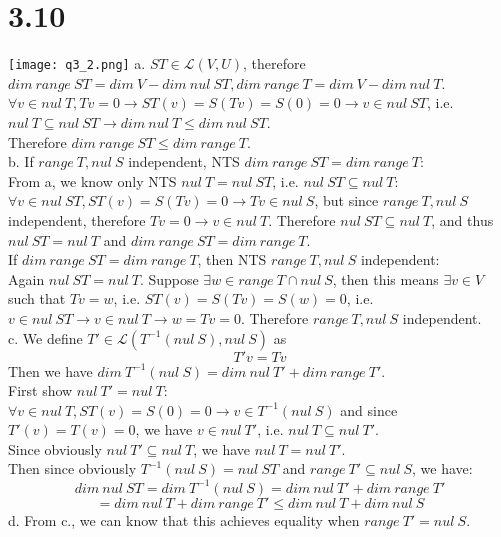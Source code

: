 \documentclass{article}
\begin{document}
\section{3.10}
\texttt{[image: q3\_2.png]}
a. $ST \in \mathcal{L}(V, U)$, therefore $dim\ range\ ST = dim\ V - dim\ nul\ ST, dim\ range\ T = dim\ V - dim\ nul\ T$.\\
$\forall v \in nul\ T, Tv = 0 \rightarrow ST(v) = S(Tv) = S(0) = 0 \rightarrow v \in nul\ ST$, i.e. $nul\ T \subseteq nul\ ST \rightarrow dim\ nul\ T \leq dim\ nul\ ST$.\\
Therefore $dim\ range\ ST \leq dim\ range\ T$.\\
b. If $range\ T, nul\ S$ independent, NTS $dim\ range\ ST = dim\ range\ T$:\\
From a, we know only NTS $nul\ T = nul\ ST$, i.e. $nul\ ST \subseteq nul\ T$:\\
$\forall v \in nul\ ST, ST(v) = S(Tv) = 0 \rightarrow Tv \in nul\ S$, but since $range\ T, nul\ S$ independent, therefore $Tv = 0 \rightarrow v \in nul\ T$. Therefore $nul\ ST \subseteq nul\ T$, and thus $nul\ ST = nul\ T$ and $dim\ range\ ST = dim\ range\ T$.\\
If $dim\ range\ ST = dim\ range\ T$, then NTS $range\ T, nul\ S$ independent:\\
Again $nul\ ST = nul\ T$. Suppose $\exists w \in range\ T \cap nul\ S$, then this means $\exists v \in V$ such that $Tv = w$, i.e. $ST(v) = S(Tv) = S(w) = 0$, i.e. $v \in nul\ ST \rightarrow v \in nul\ T \rightarrow w = Tv = 0$. Therefore $range\ T, nul\ S$ independent.\\
c. We define $T' \in \mathcal{L}(T^{-1}(nul\ S), nul\ S)$ as
\begin{equation*}
    T'v = Tv
\end{equation*}
Then we have $dim\ T^{-1}(nul\ S) = dim\ nul\ T' + dim\ range\ T'$.\\
First show $nul\ T' = nul\ T$:\\
$\forall v \in nul\ T, ST(v) = S(0) = 0 \rightarrow v \in T^{-1}(nul\ S)$ and since $T'(v) = T(v) = 0$, we have $v \in nul\ T'$, i.e. $nul\ T \subseteq nul\ T'$.\\
Since obviously $nul\ T' \subseteq nul\ T$, we have $nul\ T = nul\ T'$.\\
Then since obviously $T^{-1}(nul\ S) = nul\ ST$ and $range\ T' \subseteq nul\ S$, we have:
\begin{equation*}
    dim\ nul\ ST = dim\ T^{-1}(nul\ S) = dim\ nul\ T' + dim\ range\ T'
\end{equation*}
\begin{equation*}
    = dim\ nul\ T + dim\ range\ T' \leq dim\ nul\ T + dim\ nul\ S
\end{equation*}
d. From c., we can know that this achieves equality when $range\ T' = nul\ S$.
\end{document}
